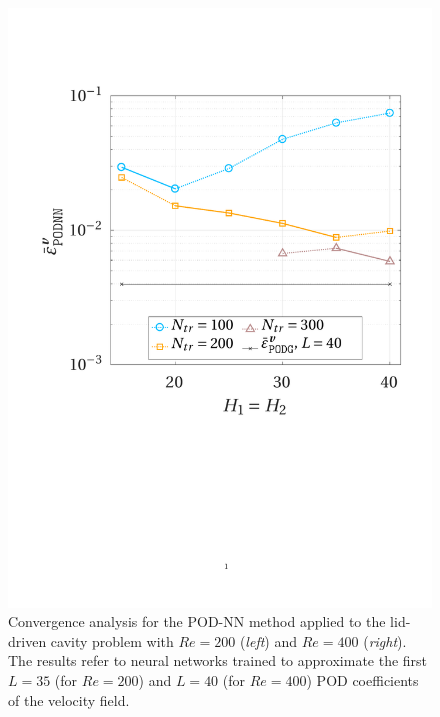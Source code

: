 \documentclass[12pt, a4paper, twoside, openright]{report}
\numberwithin{equation}{chapter}
\theoremstyle{theorem}
\theoremstyle{definition}
\theoremstyle{remark}
\theoremstyle{proposition}
\numberwithin{figure}{chapter}
\begin{document}
\begin{figure}[H]
			\includegraphics[scale = 0.43, trim = {1.5cm 9cm 1.5cm 3.5cm}, clip]{dc_400_vel_nn_convergence}
			
			\caption{Convergence analysis for the POD-NN method applied to the lid-driven cavity problem with $Re = 200$ (\emph{left}) and $Re = 400$ (\emph{right}). The results refer to neural networks trained to approximate the first $L = 35$ (for $Re = 200$) and $L = 40$ (for $Re = 400$) POD coefficients of the velocity field.}
			\label{}
		\end{figure}
		
\end{document}
